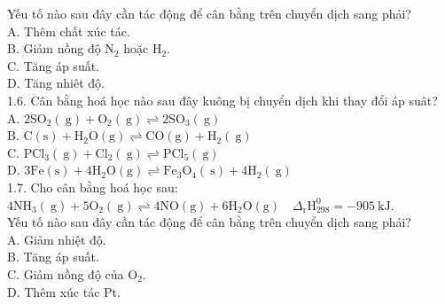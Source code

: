 \documentclass[10pt]{article}
\begin{document}
Yếu tố nào sau đây cần tác động để cân bằng trên chuyển dịch sang phải?\\
A. Thêm chất xúc tác.\\
B. Giảm nồng độ $\mathrm{N}_{2}$ hoặc $\mathrm{H}_{2}$.\\
C. Tăng áp suất.\\
D. Tăng nhiêt độ.\\
1.6. Cân bằng hoá học nào sau đây kuông bị chuyển dịch khi thay đổi áp suât?\\
A. $2 \mathrm{SO}_{2}(\mathrm{~g})+\mathrm{O}_{2}(\mathrm{~g}) \rightleftharpoons 2 \mathrm{SO}_{3}(\mathrm{~g})$\\
B. $\mathrm{C}(\mathrm{s})+\mathrm{H}_{2} \mathrm{O}(\mathrm{g}) \rightleftharpoons \mathrm{CO}(\mathrm{g})+\mathrm{H}_{2}(\mathrm{~g})$\\
C. $\mathrm{PCl}_{3}(\mathrm{~g})+\mathrm{Cl}_{2}(\mathrm{~g}) \rightleftharpoons \mathrm{PCl}_{5}(\mathrm{~g})$\\
D. $3 \mathrm{Fe}(\mathrm{s})+4 \mathrm{H}_{2} \mathrm{O}(\mathrm{g}) \rightleftharpoons \mathrm{Fe}_{3} \mathrm{O}_{4}(\mathrm{~s})+4 \mathrm{H}_{2}(\mathrm{~g})$\\
1.7. Cho cân bằng hoá học sau:\\
$4 \mathrm{NH}_{3}(\mathrm{~g})+5 \mathrm{O}_{2}(\mathrm{~g}) \rightleftharpoons 4 \mathrm{NO}(\mathrm{g})+6 \mathrm{H}_{2} \mathrm{O}(\mathrm{g}) \quad \Delta_{\mathrm{r}} \mathrm{H}_{298}^{0}=-905 \mathrm{~kJ}$.\\
Yếu tố nào sau đây cần tác động để cân bằng trên chuyển dịch sang phải?\\
A. Giảm nhiệt độ.\\
B. Tăng áp suất.\\
C. Giảm nồng độ của $\mathrm{O}_{2}$.\\
D. Thêm xúc tác Pt.
\end{document}
